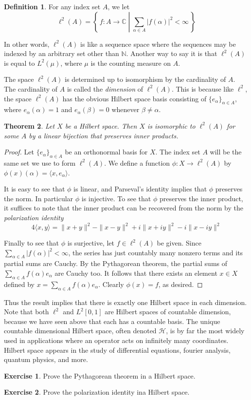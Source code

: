 \documentclass[11pt,oneside]{amsbook}
\newcommand{\set}[1]{\left\{\,#1\,\right\}}
\newcommand{\NN}{{\mathbb N}}
\newcommand{\CC}{{\mathbb C}}
\theoremstyle{definition}
\newtheorem{exerc}{Exercise}[section]
\theoremstyle{plain}
\newtheorem{thm}{Theorem}[section]
\theoremstyle{definition}
\newtheorem{defn}[thm]{Definition}
\theoremstyle{remark}
\numberwithin{equation}{section}
\numberwithin{figure}{section}
\begin{document}
\begin{defn}
  For any index set $A$, we let
  \[\ell^2(A)=\set{f\colon A\to\CC\;\left|\;\sum_{\alpha\in A}|f(\alpha)|^2<\infty\right.}
  \]
\end{defn}

In other words, $\ell^2(A)$ is like a sequence space where the sequences may be indexed by an arbitrary set other than $\NN$. Another way to say it is that $\ell^2(A)$ is equal to $L^2(\mu)$, where $\mu$ is the counting measure on $A$.

The space $\ell^2(A)$ is determined up to isomorphism by the cardinality of $A$. The cardinality of $A$ is called the \emph{dimension} of $\ell^2(A)$. This is because like $\ell^2$, the space $\ell^2(A)$ has the obvious Hilbert space basis consisting of $\{e_\alpha\}_{\alpha\in A}$, where $e_\alpha(\alpha)=1$ and $e_\alpha(\beta)=0$ whenever $\beta\neq\alpha$.

\begin{thm}
  Let $X$ be a Hilbert space. Then $X$ is isomorphic to $\ell^2(A)$ for some $A$ by a linear bijection that preserves inner products.
\end{thm}

\begin{proof}
  Let $\{e_\alpha\}_{\alpha\in A}$ be an orthonormal basis for $X$. The index set $A$ will be the same set we use to form $\ell^2(A)$. We define a function $\phi\colon X\to\ell^2(A)$ by $\phi(x)(\alpha)=\langle x,e_\alpha\rangle$.

  It is easy to see that $\phi$ is linear, and Parseval's identity implies that $\phi$ preserves the norm. In particular $\phi$ is injective. To see that $\phi$ preserves the inner product, it suffices to note that the inner product can be recovered from the norm by the \emph{polarization identity}
  \[4\langle x,y\rangle=\|x+y\|^2-\|x-y\|^2+i\|x+iy\|^2-i\|x-iy\|^2
  \]

  Finally to see that $\phi$ is surjective, let $f\in\ell^2(A)$ be given. Since $\sum_{\alpha\in A}|f(\alpha)|^2<\infty$, the series has just countably many nonzero terms and its partial sums are Cauchy. By the Pythagorean theorem, the partial sums of $\sum_{\alpha\in A}f(\alpha)e_\alpha$ are Cauchy too. It follows that there exists an element $x\in X$ defined by $x=\sum_{\alpha\in A}f(\alpha)e_\alpha$. Clearly $\phi(x)=f$, as desired.
\end{proof}

Thus the result implies that there is exactly one Hilbert space in each dimension. Note that both $\ell^2$ and $L^2[0,1]$ are Hilbert spaces of countable dimension, because we have seen above that each has a countable basis. The unique countable dimensional Hilbert space, often denoted $\mathcal H$, is by far the most widely used in applications where an operator acts on infinitely many coordinates. Hilbert space appears in the study of differential equations, fourier analysis, quantum physics, and more.

\begin{exerc}
  Prove the Pythagorean theorem in a Hilbert space.
\end{exerc}

\begin{exerc}
  Prove the polarization identity ina  Hilbert space.
\end{exerc}


\end{document}
